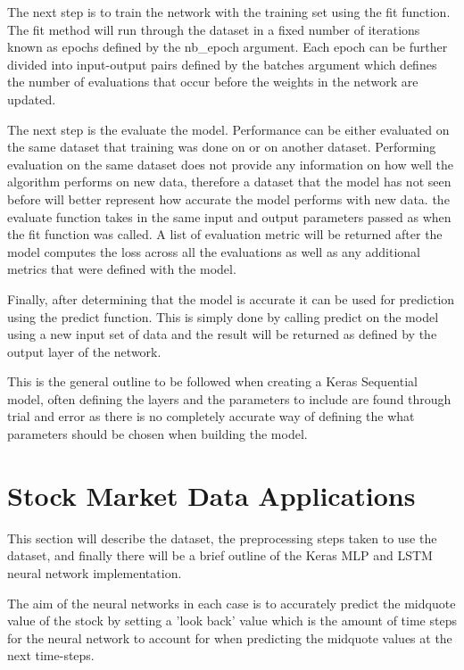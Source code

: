 The next step is to train the network with the training set using the fit function. The fit method will run through the dataset in a fixed number of iterations known as epochs defined by the nb\_epoch argument. Each epoch can be further divided into input-output pairs defined by the batches argument which defines the number of evaluations that occur before the weights in the network are updated. \cite{2017} \cite{brownlee_2017_0}

The next step is the evaluate the model. Performance can be either evaluated on the same dataset that training was done on or on another dataset. Performing evaluation on the same dataset does not provide any information on how well the algorithm performs on new data, therefore a dataset that the model has not seen before will better represent how accurate the model performs with new data. the evaluate function takes in the same input and output parameters passed as when the fit function was called. A list of evaluation metric will be returned after the model computes the loss across all the evaluations as well as any additional metrics that were defined with the model. \cite{2017} \cite{brownlee_2017_0}

Finally, after determining that the model is accurate it can be used for prediction using the predict function. This is simply done by calling predict on the model using a new input set of data and the result will be returned as defined by the output layer of the network. \cite{2017} \cite{brownlee_2017_0}

This is the general outline to be followed when creating a Keras Sequential model, often defining the layers and the parameters to include are found through trial and error as there is no completely accurate way of defining the what parameters should be chosen when building the model. 

\section{Stock Market Data Applications}\label{data}

This section will describe the dataset, the preprocessing steps taken to use the dataset, and finally there will be a brief outline of the Keras MLP and LSTM neural network implementation. 

The aim of the neural networks in each case is to accurately predict the midquote value of the stock by setting a 'look back' value which is the amount of time steps  for the neural network to account for when predicting the midquote values at the next time-steps.

